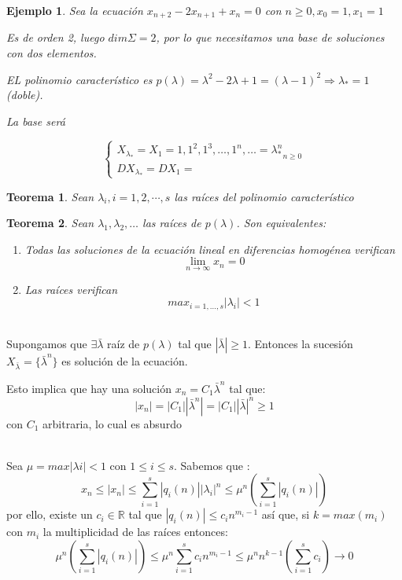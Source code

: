 \documentclass[11pt, a4paper, titlepage]{article}
\makeatletter
\renewenvironment{proof}[1][\proofname] {\vspace{-15pt}\par\pushQED{\qed}\normalfont\topsep6\p@\@plus6\p@\relax\trivlist\item[\hskip\labelsep\it#1\@addpunct{.}]\ignorespaces}{\popQED\endtrivlist\@endpefalse}
\newcommand{\R}{\mathbb{R}}
\theoremstyle{theorem-style}
\newtheorem*{nth}{Teorema}
\theoremstyle{definition-style}
\theoremstyle{remark-style}
\theoremstyle{example-style}
\newtheorem*{ejemplo}{Ejemplo}
\makeatother
\begin{document}
\begin{ejemplo}
  Sea la ecuación $x_{n+2} - 2x_{n+1} + x_n = 0$ con
  $n \geq 0, x_0 = 1, x_1 = 1$
	
  Es de orden 2, luego $dim \Sigma = 2$, por lo que necesitamos una base de
  soluciones con dos elementos.
	
  EL polinomio característico es
  $p(\lambda) = \lambda^2 - 2\lambda + 1 = (\lambda - 1)^2 \Rightarrow
  \lambda_{\ast} = 1$ (doble).
	
  La base será
	
	$$
	\begin{cases}
          X_{\lambda_{\ast}} = X_1 = {1, 1^2, 1^3, \hdots, 1^n, \hdots} = {\lambda_{\ast}^n}_{n \geq 0}\\
          DX_{\lambda_{\ast}} = DX_1 =
	\end{cases}
	$$
      \end{ejemplo}

\begin{nth}
	Sean $\lambda_i, i=1,2,\cdots,s$ las raíces del polinomio característico
\end{nth}


 \begin{nth}
        Sean $\lambda_{1}, \lambda_{2}, \hdots$ las raíces de $p(\lambda)$. Son
        equivalentes:
        \begin{enumerate}
        \item Todas las soluciones de la ecuación lineal en diferencias
          homogénea verifican $$\lim_{n \to \infty} x_{n} = 0$$
        \item Las raíces verifican $$max_{i=1,\hdots,s}|\lambda_{i}| < 1$$
        \end{enumerate}
      \end{nth}

\begin{proof}
	\boxed{\Rightarrow}\hfill \\
	Supongamos que $\exists \bar \lambda$ raíz de $p(\lambda)$ tal que $|\bar \lambda| \geq 1$. Entonces la sucesión $X_{\bar \lambda}=\{\bar \lambda ^n\}$ es solución de la ecuación.
	
	Esto implica que hay una solución $x_n = C_1 \bar \lambda ^n $ tal que:
	\[
	|x_n|=|C_1||\bar \lambda ^n | = |C_1| |\bar \lambda| ^n \geq 1
	\]
	con $C_1$ arbitraria, lo cual es absurdo
	
	\boxed{\Leftarrow}\hfill\\	
	Sea $\mu = max |\lambda i| < 1$ con $1 \leq i \leq s$.  Sabemos que :
	$$x_n \leq |x_n| \leq \sum_{i=1}^s|q_i(n)||\lambda_i|^n \leq \mu^n (\sum_{i=1}^s |q_i(n)|)$$
	por ello, existe un $c_i \in \R$ tal que $|q_i(n)| \leq c_i n^{m_i -1}$ así que, si $k = max (m_i)$ con $m_i$ la multiplicidad de las raíces entonces:
	\[
	\mu^n (\sum_{i=1}^s |q_i(n)|) \leq \mu^n \sum_{i=1}^s c_i n^{m_i -1} \leq \mu^n n^{k-1}(\sum_{i=1}^s c_i) \to 0
	\]
      \end{proof}
\end{document}
